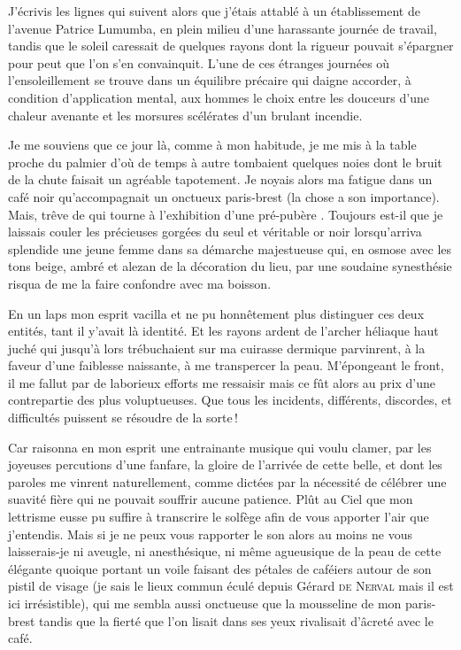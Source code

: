\begin{prose}
J’écrivis les lignes qui suivent alors que j’étais attablé à un établissement de l’avenue Patrice Lumumba, en plein milieu d’une harassante journée de travail, tandis que le soleil caressait de quelques rayons dont la rigueur pouvait s’épargner pour peut que l’on s’en convainquit.
L’une de ces étranges journées où l’ensoleillement se trouve dans un équilibre précaire qui daigne accorder, à condition d’application mental, aux hommes le choix entre les douceurs d’une chaleur avenante et les morsures scélérates d’un brulant incendie.

Je me souviens que ce jour là, comme à mon habitude, je me mis à la table proche du palmier d’où de temps à autre tombaient quelques noies dont le bruit de la chute faisait un agréable tapotement. Je noyais alors ma fatigue dans un café noir qu’accompagnait un onctueux paris-brest (la chose a son importance). Mais, trêve de  qui tourne à l’exhibition d’une  pré-pubère . Toujours est-il que je laissais couler les précieuses gorgées du seul et véritable or noir lorsqu’arriva splendide une jeune femme dans sa démarche majestueuse qui, en osmose avec les tons beige, ambré et alezan de la décoration du lieu, par une soudaine synesthésie risqua de me la faire confondre avec ma boisson.

En un laps mon esprit vacilla et ne pu honnêtement plus distinguer ces deux entités, tant il y’avait là identité. Et les rayons ardent de l’archer héliaque haut juché qui jusqu’à lors trébuchaient sur ma cuirasse dermique parvinrent, à la faveur d’une faiblesse naissante, à me transpercer la peau. M’épongeant le front, il me fallut par de laborieux efforts me ressaisir mais ce fût alors au prix d’une contrepartie des plus voluptueuses. Que tous les incidents, différents, discordes, et difficultés puissent se résoudre de la sorte\,!

Car raisonna en mon esprit une entrainante musique qui voulu clamer, par les joyeuses percutions d’une fanfare, la gloire de l’arrivée de cette belle, et dont les paroles me vinrent naturellement, comme dictées par la nécessité de célébrer une suavité fière qui ne pouvait souffrir aucune patience. Plût au Ciel que mon lettrisme eusse pu suffire à transcrire le solfège afin de vous apporter l’air que j’entendis. Mais si je ne peux vous rapporter le son alors au moins ne vous laisserais-je ni aveugle, ni anesthésique, ni même agueusique  de la peau de cette élégante quoique portant un voile faisant des pétales de caféiers autour de son pistil de visage (je sais le lieux commun éculé depuis Gérard \textsc{de Nerval} mais il est ici irrésistible), qui me sembla aussi onctueuse que la mousseline de mon paris-brest tandis que la fierté que l’on lisait dans ses yeux rivalisait d’âcreté avec le café.


\end{prose}
